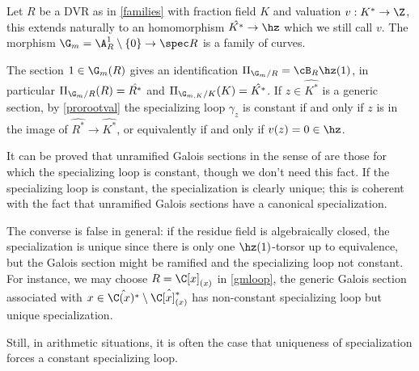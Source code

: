 \begin{example}
\notready\label{gmloop}
	Let $R$ be a DVR as in \autoref{families} with fraction field $K$ and valuation $v:K^{*}\to\Z$, this extends naturally to an homomorphism $\hat{K^{*}}\to\hz$ which we still call $v$. The morphism $\G_{m}=\A^{1}_{R}\setminus\{0\}\to \spec R$ is a family of curves.

	The section $1\in\G_{m}(R)$ gives an identification $\Pi_{\G_{m}/R}=\cB_{R}\hz(1)$, in particular $\Pi_{\G_{m}/R}(R)=\hat{R^*}$ and $\Pi_{\G_{m,K}/K}(K)=\hat{K^*}$. If $z\in\hat{K^{*}}$ is a generic section, by \autoref{prorootval} the specializing loop $\gamma_{z}$ is constant if and only if $z$ is in the image of $\hat{R^{*}}\to\hat{K^{*}}$, or equivalently if and only if $v(z)=0\in\hz$.
\end{example}

It can be proved that unramified Galois sections in the sense of \cite[Chapter 8]{sti13} are those for which the specializing loop is constant, though we don't need this fact. If the specializing loop is constant, the specialization is clearly unique; this is coherent with the fact that unramified Galois sections have a canonical specialization.

The converse is false in general: if the residue field is algebraically closed, the specialization is unique since there is only one $\hz(1)$-torsor up to equivalence, but the Galois section might be ramified and the specializing loop not constant. For instance, we may choose $R=\C[x]_{(x)}$ in \autoref{gmloop}, the generic Galois section associated with $x\in\hat{\C(x)^{*}}\setminus\hat{\C[x]_{(x)}^{*}}$ has non-constant specializing loop but unique specialization.

Still, in arithmetic situations, it is often the case that uniqueness of specialization forces a constant specializing loop.

